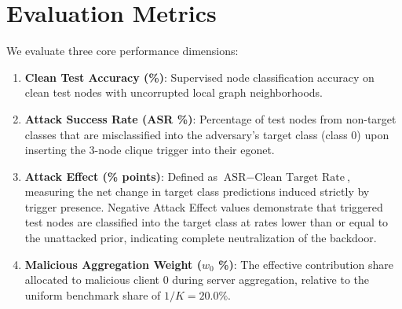 \section{Evaluation Metrics}
\label{sec:evaluation_metrics}
We evaluate three core performance dimensions:
\begin{enumerate}
    \item \textbf{Clean Test Accuracy (\%)}: Supervised node classification accuracy on clean test nodes with uncorrupted local graph neighborhoods.
    \item \textbf{Attack Success Rate (ASR \%)}: Percentage of test nodes from non-target classes that are misclassified into the adversary's target class (class 0) upon inserting the 3-node clique trigger into their egonet.
    \item \textbf{Attack Effect (\% points)}: Defined as $\text{ASR} - \text{Clean Target Rate}$, measuring the net change in target class predictions induced strictly by trigger presence. Negative Attack Effect values demonstrate that triggered test nodes are classified into the target class at rates lower than or equal to the unattacked prior, indicating complete neutralization of the backdoor.
    \item \textbf{Malicious Aggregation Weight ($w_0$ \%)}: The effective contribution share allocated to malicious client 0 during server aggregation, relative to the uniform benchmark share of $1/K = 20.0\%$.
\end{enumerate}
